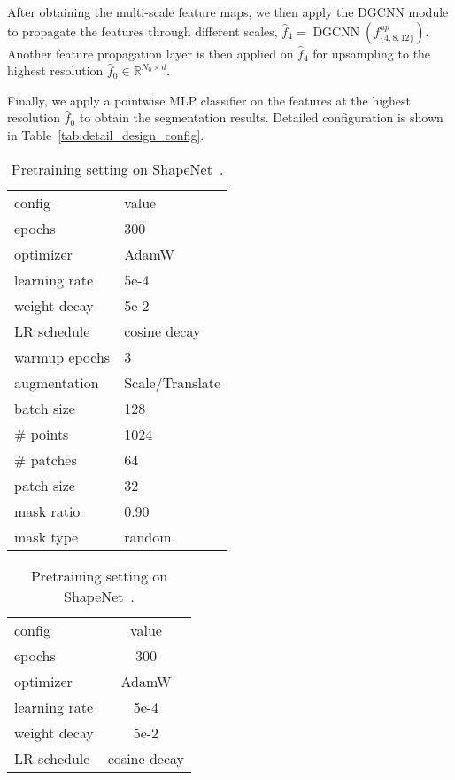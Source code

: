 \documentclass[runningheads]{llncs}
\begin{document}
After obtaining the multi-scale feature maps, we then apply the DGCNN module to propagate the features through different scales, $\hat{f}_4 = \operatorname{DGCNN}(f^{up}_{\{4,8,12\}})$.  Another feature propagation layer is then applied on $\hat{f}_4$ for upsampling to the highest resolution $\hat{f}_0 \in \mathbb{R}^{N_0 \times d}$.

Finally, we apply a pointwise MLP classifier on the features at the highest resolution $\hat{f}_0$ to obtain the segmentation results.  Detailed configuration is shown in Table~\ref{tab:detail_design_config}.


\begin{table}[t!]
\tabcolsep=0.2cm

\parbox{.45\linewidth}{
    \begin{tabular}{l|l}
        config & value\\
        \shline
        epochs & 300 \\
        optimizer & AdamW \\
        learning rate & 5e-4 \\
        weight decay & 5e-2 \\
        LR schedule & cosine decay \\
        warmup epochs & 3 \\
        augmentation & Scale/Translate \\
        batch size & 128 \\
        \# points & 1024 \\
        \# patches & 64 \\
        patch size & 32 \\
        mask ratio & 0.90 \\
        mask type & random \\
    \end{tabular}
    \vspace{3pt}
    \caption{Pretraining setting on ShapeNet~\cite{chang2015shapenet}.}
    \label{tab:pretrain_shapenet}
}
\hspace{.05\linewidth}
\parbox{.45\linewidth}{
    \centering
    \begin{tabular}[t]{l|c}
        config & value \\
        \shline
        epochs & 300 \\
        optimizer & AdamW \\
        learning rate & 5e-4 \\
        weight decay & 5e-2 \\
        LR schedule & cosine decay \\

\end{tabular}}
\end{table}
\end{document}
